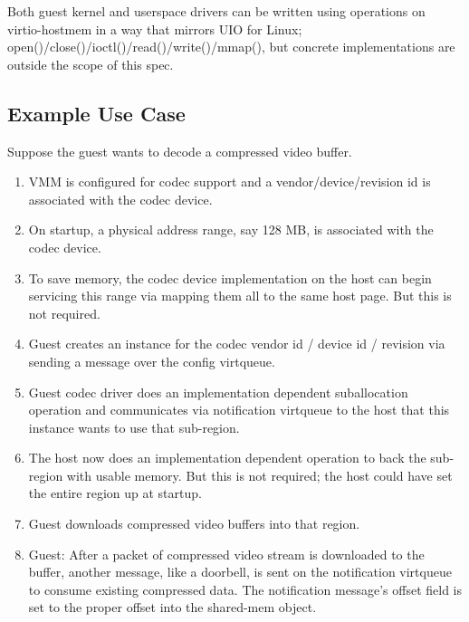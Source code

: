 Both guest kernel and userspace drivers can be written using operations
on virtio-hostmem in a way that mirrors UIO for Linux;
open()/close()/ioctl()/read()/write()/mmap(),
but concrete implementations are outside the scope of this spec.

\subsection{Example Use Case}\label{sec:Device Types / Host Memory Device / Example Use Case}

Suppose the guest wants to decode a compressed video buffer.

\begin{enumerate}

\item VMM is configured for codec support and a vendor/device/revision id is associated
    with the codec device.

\item On startup, a physical address range, say 128 MB, is associated with the codec device.

\item To save memory, the codec device implementation on the host
    can begin servicing this range via mapping them all to the same host page. But this is not required.

\item Guest creates an instance for the codec vendor id / device id / revision
    via sending a message over the config virtqueue.

\item Guest codec driver does an implementation dependent suballocation operation and communicates via
    notification virtqueue to the host that this instance wants to use that sub-region.

\item The host now does an implementation dependent operation to back the sub-region with usable memory.
    But this is not required; the host could have set the entire region up at startup.

\item Guest downloads compressed video buffers into that region.

\item Guest: After a packet of compressed video stream is downloaded to the
    buffer, another message, like a doorbell, is sent on the notification virtqueue to
        consume existing compressed data. The notification message's offset field is
        set to the proper offset into the shared-mem object.


\end{enumerate}
